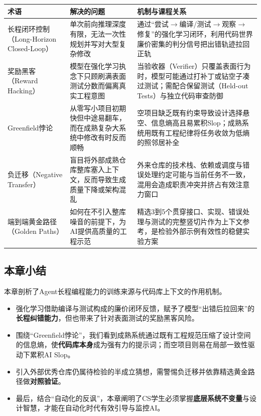 \documentclass[UTF8,a4paper,11pt,fontset=fandol]{ctexart}
\begin{document}
\begin{center}\small\begin{tabularx}{\linewidth}{YYY}

\toprule

术语 & 解决的问题 & 机制与课程关系\\\midrule

长程闭环控制（Long-Horizon Closed-Loop） & 单次前向推理深度有限，无法一次性规划并写对大型复杂修改 & 通过“尝试\ensuremath{\rightarrow}编译/测试\ensuremath{\rightarrow}观察\ensuremath{\rightarrow}修复”的强化学习闭环，利用代码世界廉价密集的判分信号把出错轨迹拉回正轨\\[3pt]

奖励黑客（Reward Hacking） & 模型在强化学习执念下只顾刷满表面测试分数而偏离真实工程意图 & 当验收器（Verifier）只覆盖表面行为时，模型可能通过打补丁或钻空子凑过测试；需配合保留测试（Held-out Tests）与独立代码审查防御\\[3pt]

Greenfield悖论 & 从零写小项目初期快但中途易翻车，而在成熟复杂大系统中修改有时反而顺畅 & 空项目缺乏既有约束导致设计选择悬空、信息熵高且易累积Slop；成熟系统用既有工程纪律将任务收敛为低熵的照邻居补全\\[3pt]

负迁移（Negative Transfer） & 盲目将外部成熟仓库整库塞入上下文，反而导致生成质量下降或架构混乱 & 外来仓库的技术栈、依赖或调度与错误处理约定可能与当前任务不一致，混用会造成职责冲突并挤占有效注意力窗口\\[3pt]

端到端黄金路径（Golden Paths） & 如何在不引入整库噪音的前提下，为AI提供高质量的工程示范 & 精选3到5个贯穿接口、实现、错误处理与测试的完整竖切片作为上下文参考，是检验外部示例有效性的稳健实验方案\\[3pt]

\bottomrule\end{tabularx}\end{center}

\subsection{本章小结}

本章剖析了Agent长程编程能力的训练来源与代码库上下文的作用机制。

\begin{itemize}
\item 强化学习借助编译与测试构成的廉价闭环反馈，赋予了模型“出错后拉回来”的\textbf{长程纠错能力}，但也带来了针对表面测试的奖励黑客风险。

\item 围绕“Greenfield悖论”，我们看到成熟系统通过既有工程规范压缩了设计空间的信息熵，使\textbf{代码库本身}成为强有力的提示词；而空项目则易在局部一致性驱动下累积AI Slop。

\item 引入外部优秀仓库仍属待检验的半成立猜想，需警惕负迁移并依靠精选黄金路径做\textbf{对照验证}。

\item 最后，结合“自动化的反讽”，本章阐明了CS学生必须掌握\textbf{底层系统不变量}与设计智慧，才能在自动化时代有效引导与监控AI。
\end{itemize}
\end{document}
